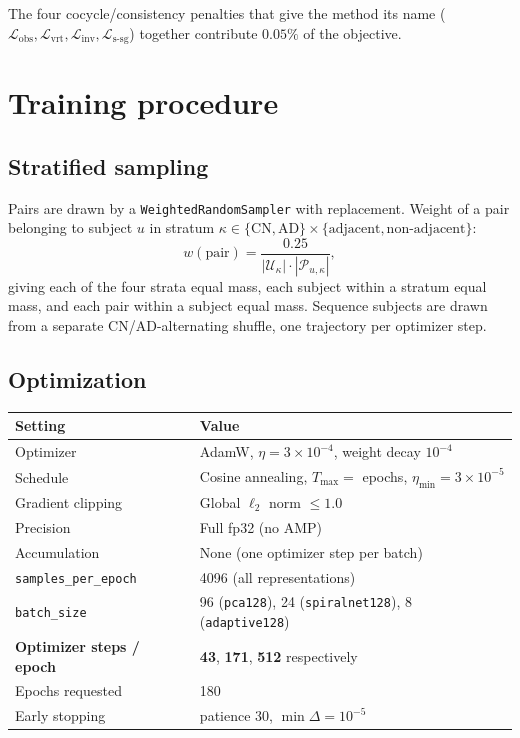 \documentclass[11pt]{article}
\newcommand{\Loss}{\mathcal{L}}
\begin{document}
\noindent The four cocycle/consistency penalties that give the method its name
($\Loss_{\mathrm{obs}}, \Loss_{\mathrm{vrt}}, \Loss_{\mathrm{inv}}, \Loss_{\mathrm{s\text{-}sg}}$)
together contribute $0.05\%$ of the objective.

\section{Training procedure}

\subsection{Stratified sampling}

Pairs are drawn by a \texttt{WeightedRandomSampler} with replacement. Weight of a pair
belonging to subject $u$ in stratum $\kappa \in \{\mathrm{CN},\mathrm{AD}\} \times
\{\text{adjacent}, \text{non-adjacent}\}$:
\begin{equation}
  w(\text{pair}) = \frac{0.25}{|\mathcal{U}_\kappa| \cdot |\mathcal{P}_{u,\kappa}|},
\end{equation}
giving each of the four strata equal mass, each subject within a stratum equal mass, and
each pair within a subject equal mass. Sequence subjects are drawn from a separate
CN/AD-alternating shuffle, one trajectory per optimizer step.

\subsection{Optimization}

\begin{center}
\begin{tabular}{ll}
\toprule
Setting & Value \\
\midrule
Optimizer & AdamW, $\eta = 3\times10^{-4}$, weight decay $10^{-4}$ \\
Schedule & Cosine annealing, $T_{\max} = $ epochs, $\eta_{\min} = 3\times10^{-5}$ \\
Gradient clipping & Global $\ell_2$ norm $\le 1.0$ \\
Precision & Full fp32 (no AMP) \\
Accumulation & None (one optimizer step per batch) \\
\texttt{samples\_per\_epoch} & 4096 (all representations) \\
\texttt{batch\_size} & 96 (\texttt{pca128}), 24 (\texttt{spiralnet128}), 8 (\texttt{adaptive128}) \\
\textbf{Optimizer steps / epoch} & \textbf{43}, \textbf{171}, \textbf{512} respectively \\
Epochs requested & 180 \\
Early stopping & patience 30, $\min\Delta = 10^{-5}$ \\
\bottomrule
\end{tabular}
\end{center}
\end{document}
